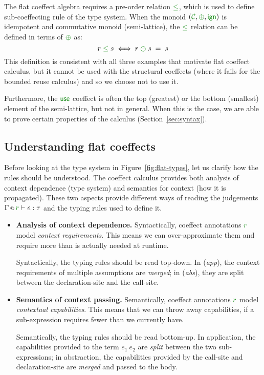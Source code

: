 The flat coeffect algebra requires a pre-order relation $\cleq$, which is used to define 
sub-coeffecting rule of the type system. When the monoid $(\C, \cpar, \czero)$ is idempotent
and commutative monoid (semi-lattice), the $\cleq$ relation can be defined in terms of $\cpar$ as:
%
\begin{equation*}
r \;\cleq\; s \;\Longleftrightarrow\; r \;\cpar\; s \;=\; s
\end{equation*}
%
This definition is consistent with all three examples that motivate flat coeffect calculus, but
it cannot be used with the structural coeffects (where it fails for the bounded reuse 
calculus) and so we choose not to use it.

Furthermore, the $\cunit$ coeffect is often the top (greatest) or the bottom (smallest) 
element of the semi-lattice, but not in general. When this is the case, we are able
to prove certain properties of the calculus (Section~\ref{sec:syntax}).


\subsection{Understanding flat coeffects}

Before looking at the type system in Figure~\ref{fig:flat-types}, let us clarify how the rules
should be understood. The coeffect calculus provides both analysis of context dependence (type 
system) and semantics for context (how it is propagated). These two aspects provide different
ways of reading the judgements $\coctx{\Gamma}{\cclrd{r}} \vdash e : \tau$ and the typing rules
used to define it.

\begin{itemize}
\item \textbf{Analysis of context dependence.}
Syntactically, coeffect annotations $\cclrd{r}$ model \emph{context requirements}. This means
we can over-approximate them and require more than is actually needed at runtime. 

Syntactically, the typing rules should be read top-down. In (\emph{app}), the context requirements 
of multiple assumptions are \emph{merged}; in (\emph{abs}), they are split between the declaration-site
and the call-site.

\item \textbf{Semantics of context passing.}
Semantically, coeffect annotations $\cclrd{r}$ mo\-del \emph{contextual capabilities}. This means
that we can throw away capabilities, if a sub-expression requires fewer than we 
currently have.

Semantically, the typing rules should be read bottom-up. In application, the capabilities 
provided to the term $e_1~e_2$ are \emph{split} between the two sub-expressions; in abstraction,
the capabilities provided by the call-site and declaration-site are \emph{merged} and passed
to the body.
\end{itemize}

